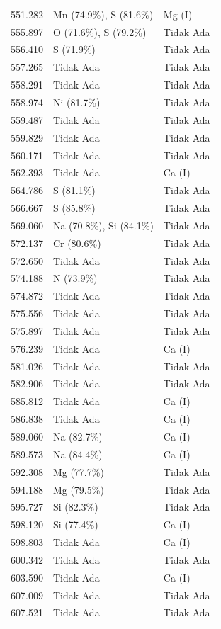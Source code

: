 \begin{onehalfspace}
\begin{longtable}{p{} p{} p{}}
    551.282 & Mn (74.9\%), S (81.6\%) & Mg (I) \\
    555.897 & O (71.6\%), S (79.2\%) & Tidak Ada \\
    556.410 & S (71.9\%) & Tidak Ada \\
    557.265 & Tidak Ada & Tidak Ada \\
    558.291 & Tidak Ada & Tidak Ada \\
    558.974 & Ni (81.7\%) & Tidak Ada \\
    559.487 & Tidak Ada & Tidak Ada \\
    559.829 & Tidak Ada & Tidak Ada \\
    560.171 & Tidak Ada & Tidak Ada \\
    562.393 & Tidak Ada & Ca (I) \\
    564.786 & S (81.1\%) & Tidak Ada \\
    566.667 & S (85.8\%) & Tidak Ada \\
    569.060 & Na (70.8\%), Si (84.1\%) & Tidak Ada \\
    572.137 & Cr (80.6\%) & Tidak Ada \\
    572.650 & Tidak Ada & Tidak Ada \\
    574.188 & N (73.9\%) & Tidak Ada \\
    574.872 & Tidak Ada & Tidak Ada \\
    575.556 & Tidak Ada & Tidak Ada \\
    575.897 & Tidak Ada & Tidak Ada \\
    576.239 & Tidak Ada & Ca (I) \\
    581.026 & Tidak Ada & Tidak Ada \\
    582.906 & Tidak Ada & Tidak Ada \\
    585.812 & Tidak Ada & Ca (I) \\
    586.838 & Tidak Ada & Ca (I) \\
    589.060 & Na (82.7\%) & Ca (I) \\
    589.573 & Na (84.4\%) & Ca (I) \\
    592.308 & Mg (77.7\%) & Tidak Ada \\
    594.188 & Mg (79.5\%) & Tidak Ada \\
    595.727 & Si (82.3\%) & Tidak Ada \\
    598.120 & Si (77.4\%) & Ca (I) \\
    598.803 & Tidak Ada & Ca (I) \\
    600.342 & Tidak Ada & Tidak Ada \\
    603.590 & Tidak Ada & Ca (I) \\
    607.009 & Tidak Ada & Tidak Ada \\
    607.521 & Tidak Ada & Tidak Ada \\


\end{longtable}
\end{onehalfspace}
